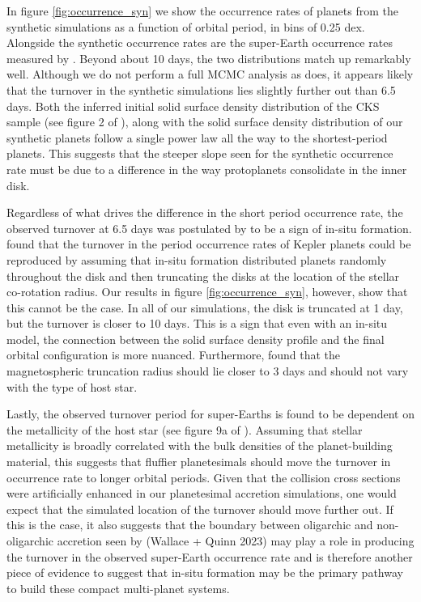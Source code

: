 In figure \ref{fig:occurrence_syn} we show the occurrence rates of planets from the synthetic simulations as a function of orbital period, in bins of 0.25 dex. Alongside the synthetic occurrence rates are the super-Earth occurrence rates measured by \cite{petigura18}. Beyond about 10 days, the two distributions match up remarkably well. Although we do not perform a full MCMC analysis as \cite{petigura18} does, it appears likely that the turnover in the synthetic simulations lies slightly further out than 6.5 days. Both the inferred initial solid surface density distribution of the CKS sample (see figure 2 of \cite{dai20}), along with the solid surface density distribution of our synthetic planets follow a single power law all the way to the shortest-period planets. This suggests that the steeper slope seen for the synthetic occurrence rate must be due to a difference in the way protoplanets consolidate in the inner disk. 

Regardless of what drives the difference in the short period occurrence rate, the observed turnover at 6.5 days was postulated by \cite{petigura18} to be a sign of in-situ formation. \cite{lee17} found that the turnover in the period occurrence rates of Kepler planets could be reproduced by assuming that in-situ formation distributed planets randomly throughout the disk and then truncating the disks at the location of the stellar co-rotation radius. Our results in figure \ref{fig:occurrence_syn}, however, show that this cannot be the case. In all of our simulations, the disk is truncated at 1 day, but the turnover is closer to 10 days. This is a sign that even with an in-situ model, the connection between the solid surface density profile and the final orbital configuration is more nuanced. Furthermore, \cite{batygin23} found that the magnetospheric truncation radius should lie closer to 3 days and should not vary with the type of host star.

Lastly, the observed turnover period for super-Earths is found to be dependent on the metallicity of the host star (see figure 9a of \cite{petigura18}). Assuming that stellar metallicity is broadly correlated with the bulk densities of the planet-building material, this suggests that fluffier planetesimals should move the turnover in occurrence rate to longer orbital periods. Given that the collision cross sections were artificially enhanced in our planetesimal accretion simulations, one would expect that the simulated location of the turnover should move further out. If this is the case, it also suggests that the boundary between oligarchic and non-oligarchic accretion seen by (Wallace + Quinn 2023) may play a role in producing the turnover in the observed super-Earth occurrence rate and is therefore another piece of evidence to suggest that in-situ formation may be the primary pathway to build these compact multi-planet systems.

